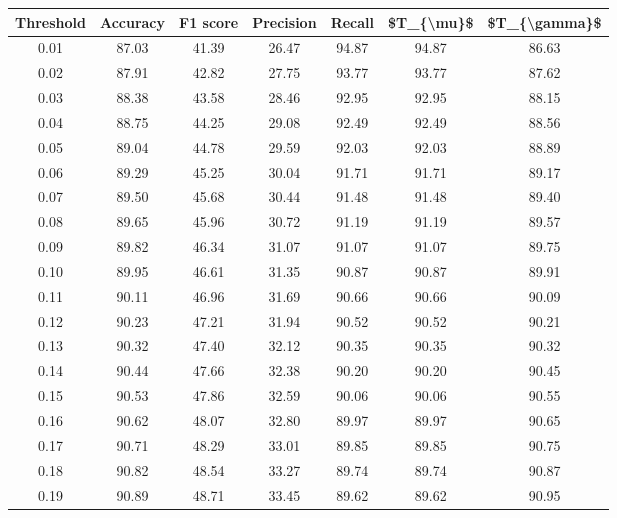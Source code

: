 \begin{tabular}{|c|c|c|c|c|c|c|}
\hline
 Threshold &  Accuracy &  F1 score &  Precision &  Recall &  \$T\_\{\textbackslash mu\}\$ &  \$T\_\{\textbackslash gamma\}\$ \\
\hline
      0.01 &     87.03 &     41.39 &      26.47 &   94.87 &      94.87 &         86.63 \\
      0.02 &     87.91 &     42.82 &      27.75 &   93.77 &      93.77 &         87.62 \\
      0.03 &     88.38 &     43.58 &      28.46 &   92.95 &      92.95 &         88.15 \\
      0.04 &     88.75 &     44.25 &      29.08 &   92.49 &      92.49 &         88.56 \\
      0.05 &     89.04 &     44.78 &      29.59 &   92.03 &      92.03 &         88.89 \\
      0.06 &     89.29 &     45.25 &      30.04 &   91.71 &      91.71 &         89.17 \\
      0.07 &     89.50 &     45.68 &      30.44 &   91.48 &      91.48 &         89.40 \\
      0.08 &     89.65 &     45.96 &      30.72 &   91.19 &      91.19 &         89.57 \\
      0.09 &     89.82 &     46.34 &      31.07 &   91.07 &      91.07 &         89.75 \\
      0.10 &     89.95 &     46.61 &      31.35 &   90.87 &      90.87 &         89.91 \\
      0.11 &     90.11 &     46.96 &      31.69 &   90.66 &      90.66 &         90.09 \\
      0.12 &     90.23 &     47.21 &      31.94 &   90.52 &      90.52 &         90.21 \\
      0.13 &     90.32 &     47.40 &      32.12 &   90.35 &      90.35 &         90.32 \\
      0.14 &     90.44 &     47.66 &      32.38 &   90.20 &      90.20 &         90.45 \\
      0.15 &     90.53 &     47.86 &      32.59 &   90.06 &      90.06 &         90.55 \\
      0.16 &     90.62 &     48.07 &      32.80 &   89.97 &      89.97 &         90.65 \\
      0.17 &     90.71 &     48.29 &      33.01 &   89.85 &      89.85 &         90.75 \\
      0.18 &     90.82 &     48.54 &      33.27 &   89.74 &      89.74 &         90.87 \\
      0.19 &     90.89 &     48.71 &      33.45 &   89.62 &      89.62 &         90.95 \\

\end{tabular}
